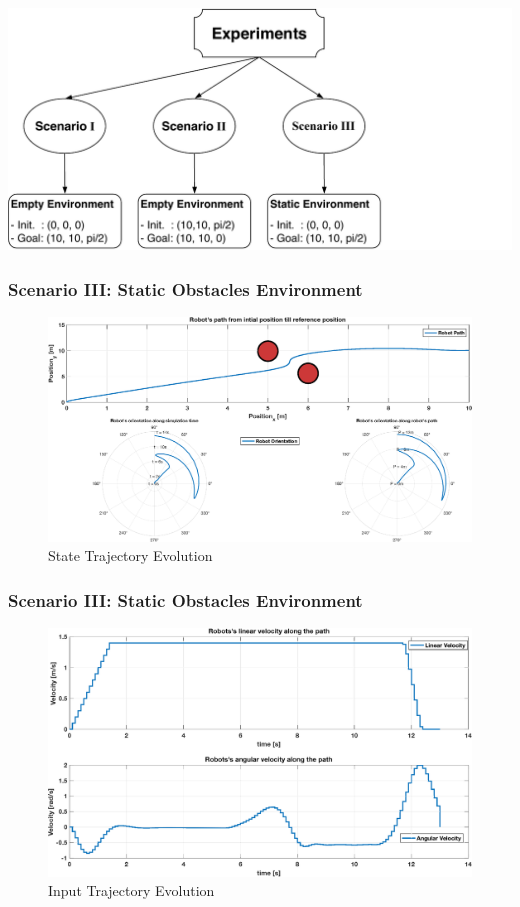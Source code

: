 	\begin{frame}
		\centering
		\includegraphics[scale=0.7]{pictures/eperiments_3.pdf}
	\end{frame}
 	
 	\begin{frame}
 		\frametitle{Scenario \textrm{III}: Static Obstacles Environment}
 		\begin{figure}[hbtp]
 			\centering
 			\includegraphics[scale=0.44]{pictures/graphs/sn2_states.eps}
 			\caption{State Trajectory Evolution}
 		\end{figure}
 	\end{frame}
 	
 	\begin{frame}
 		\frametitle{Scenario \textrm{III}: Static Obstacles Environment}
 		\begin{figure}[hbtp]
 			\centering
 			\includegraphics[scale=0.42]{pictures/graphs/sn2_inputs.eps}
 			\caption{Input Trajectory Evolution}
 		\end{figure}
 	\end{frame}
 	
